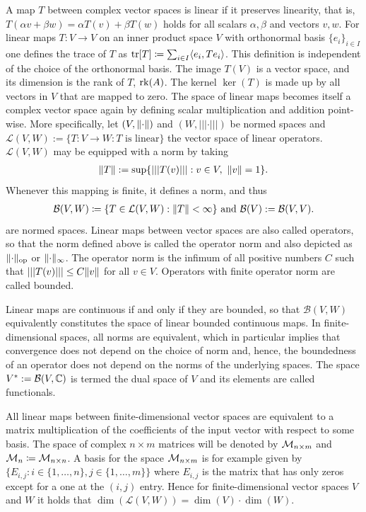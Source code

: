 A map $T$ between complex vector spaces is linear if it preserves linearity, that is, $T(\alpha v + \beta w ) = \alpha T(v) + \beta T(w)$ holds for all scalars $\alpha,\beta$ and vectors $v,w$. For linear maps $T:V \rightarrow V$ on an inner product space $V$ with orthonormal basis $\{e_i\}_{i\in I}$ one defines the trace of $T$ as $\mathrm{tr}[T]\coloneqq \sum_{i\in I}\langle e_i, T e_i\rangle$. This definition is independent of the choice of the orthonormal basis. The image $T(V)$ is a vector space, and its dimension is the rank of $T$, $\mathrm{rk}(A)$. The kernel $\ker(T)$ is made up by all vectors in $V$ that are mapped to zero. The space of linear maps becomes itself a complex vector space again by defining scalar multiplication and addition point-wise. More specifically, let $(V, \lVert\cdot\rVert)$ and $(W, \lvert\lvert \lvert \cdot \rvert \rvert \rvert)$ be normed spaces and $\mathcal L(V,W):=\{T:V \rightarrow W: \text{$T$ is linear}\}$ the vector space of linear operators. $\mathcal L(V,W)$ may be equipped with a norm by taking
\begin{align}
    \lVert T\rVert := \sup\{\lvert \lvert \lvert T(v)\rvert \rvert \rvert: v \in V, \ \lVert v\rVert = 1\}.
\end{align}
Whenever this mapping is finite, it defines a norm, and thus
\begin{align}
    \mathcal B(V,W) \coloneqq \{T \in \mathcal L(V,W): \lVert T\rVert < \infty\}\text{ and }\mathcal B(V):=\mathcal B(V,V).
\end{align}
are normed spaces. Linear maps between vector spaces are also called operators, so that the norm defined above is called the operator norm and also depicted as $\lVert\cdot\rVert _\text{op}$ or $\lVert\cdot\rVert _{\infty}$. The operator norm is the infimum of all positive numbers $C$ such that $\lvert \lvert \lvert T(v)\rvert \rvert \rvert \leq C\lVert v\rVert$ for all $v\in V$. Operators with finite operator norm are called bounded.

Linear maps are continuous if and only if they are bounded, so that $\mathcal B(V, W)$ equivalently constitutes the space of linear bounded continuous maps. In finite-dimensional spaces, all norms are equivalent, which in particular implies that convergence does not depend on the choice of norm and, hence, the boundedness of an operator does not depend on the norms of the underlying spaces. The space $V^*:=\mathcal B(V,\mathbb{C})$ is termed the dual space of $V$ and its elements are called functionals. 


All linear maps between finite-dimensional vector spaces are equivalent to a matrix multiplication of the coefficients of the input vector with respect to some basis. The space of complex $n\times m$ matrices will be denoted by $\mathcal M_{n\times m}$ and $\mathcal M_n\coloneqq \mathcal M_{n \times n}$. A basis for the space $\mathcal M_{n \times m}$ is for example given by $\{E_{i,j}: i\in \{1,\dots,n\},  j \in\{1,\dots, m\}\}$ where $E_{i,j}$ is the matrix that has only zeros except for a one at the $(i,j)$ entry. Hence for finite-dimensional vector spaces $V$ and $W$ it holds that $\dim(\mathcal L(V,W)) = \dim(V) \cdot \dim(W)$.

